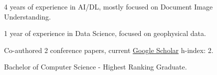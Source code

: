 \begin{zitemize}
    \item 4 years of experience in AI/DL, mostly focused on Document Image Understanding.
    \item 1 year of experience in Data Science, focused on geophysical data.
    \item Co-authored 2 conference papers, current \href{https://scholar.google.com/citations?user=iRZlaI8AAAAJ}{Google Scholar} h-index: 2.
    \item Bachelor of Computer Science - Highest Ranking Graduate.
\end{zitemize}
